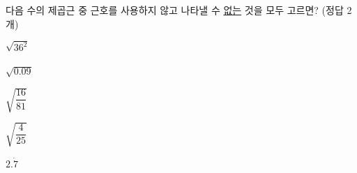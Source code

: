 다음 수의 제곱근 중 근호를 사용하지 않고 나타낼 수 \underline{없는} 것을 모두 고르면? (정답 2개)
\begin{choices32}{\rule[-3ex]{0pt}{8ex}$\sqrt{36^2}$}{\rule[-3ex]{0pt}{8ex}$\sqrt{0.09}$}{\rule[-3ex]{0pt}{8ex}$\sqrt{\dfrac{16}{81}}$}{\rule[-3ex]{0pt}{8ex}$\sqrt{\dfrac{4}{25}}$}{\rule[-3ex]{0pt}{8ex}$2.\dot{7}$}\end{choices32}
